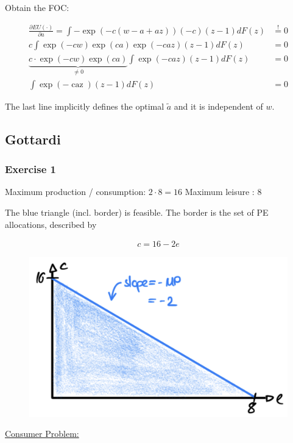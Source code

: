 {\begin{enumerate}[label=(\alph*)]
{Obtain the FOC:

\begin{align*}
    \frac{\partial E U(\cdot)}{\partial a}=\int-\exp (-c(w-a+a z))(-c)(z-1) d F(z)  &\stackrel{!}{=} 0 \\
    c \int \exp (-c w) \exp (c a) \exp (-c a z)(z-1) d F(z) &=0 \\
    \underbrace{c \cdot \exp (-c w) \exp (c a)}_{\neq 0} \int \exp (-c a z)(z-1) d F(z) &=0 \\
    \int \exp (-\operatorname{caz})(z-1) d F(z) &=0
\end{align*}

The last line implicitly defines the optimal $\tilde{a}$ and it is independent of $w$.
}
\end{enumerate}
}

\newpage
{
\subsection*{Gottardi}

\subsubsection*{Exercise 1}

\begin{enumerate}[label=(\alph*)]
{\item 
Maximum production / consumption: $2 \cdot 8=16$
Maximum leisure : $8$

The blue triangle (incl. border) is feasible. The border is the set of PE allocations, described by

\begin{align*}
    c=16-2 e
\end{align*}

\begin{figure}[h!]
    \centering
    \includegraphics[width=0.75\linewidth]{images/2013_14_1.png}
\end{figure}
}
{\item 
\underline{Consumer Problem:}

}
\end{enumerate}}
